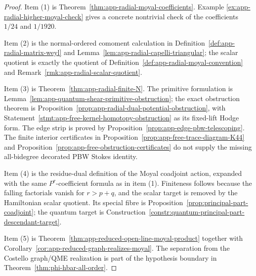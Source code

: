\begin{proof}
  Item (1) is
  Theorem~\ref{thm:app-radial-moyal-coefficients}.  Example
  \ref{ex:app-radial-higher-moyal-check} gives a concrete nontrivial
  check of the coefficients \(1/24\) and \(1/1920\).

  Item (2) is the normal-ordered comoment calculation in
  Definition~\ref{def:app-radial-matrix-weyl} and
  Lemma~\ref{lem:app-radial-capelli-triangular}; the scalar quotient is
  exactly the quotient of
  Definition~\ref{def:app-radial-moyal-convention} and
  Remark~\ref{rmk:app-radial-scalar-quotient}.

  Item (3) is
  Theorem~\ref{thm:app-radial-finite-N}.  The primitive formulation is
  Lemma~\ref{lem:app-quantum-shear-primitive-obstruction}; the exact
  obstruction theorem is
  Proposition~\ref{prop:app-radial-dual-potential-obstruction}, with
  Statement~\ref{stmt:app-free-kernel-homotopy-obstruction} as its
  fixed-lift Hodge form.  The edge
  strip is proved by
  Proposition~\ref{prop:app-edge-pbw-telescoping}.  The finite
  interior certificates in
  Proposition~\ref{prop:app-free-trace-diagram-K44} and
  Proposition~\ref{prop:app-free-obstruction-certificates} do not supply
  the missing all-bidegree decorated PBW Stokes identity.

  Item (4) is the residue-dual definition of the Moyal coadjoint action,
  expanded with the same \(P^r\)-coefficient formula as in item (1).
  Finiteness follows because the falling factorials vanish for
  \(r>p+q\), and the scalar target is removed by the Hamiltonian scalar
  quotient.  Its special fibre is
  Proposition~\ref{prop:principal-part-coadjoint}; the quantum target is
  Construction~\ref{constr:quantum-principal-part-descendant-target}.

  Item (5) is
  Theorem~\ref{thm:app-reduced-open-line-moyal-product} together with
  Corollary~\ref{cor:app-reduced-graph-realizes-moyal}.  The separation
  from the Costello graph/QME realization is part of the hypothesis
  boundary in Theorem~\ref{thm:phi-hbar-all-order}.
\end{proof}
